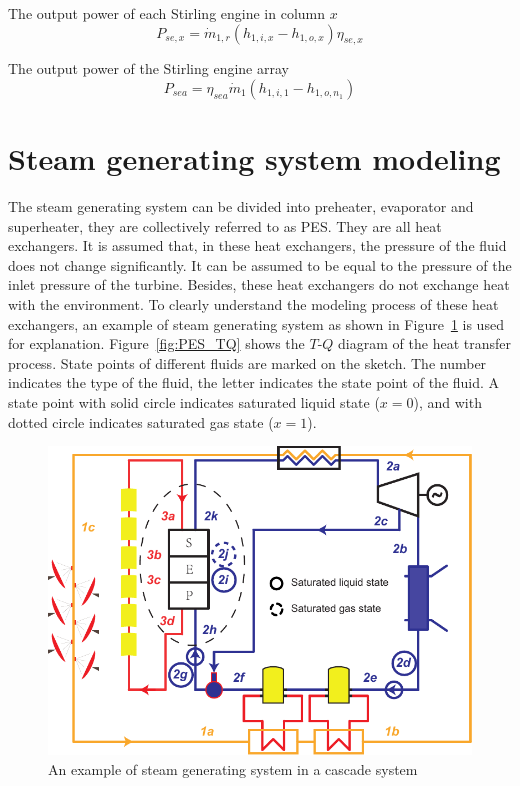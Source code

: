 The output power of each Stirling engine in column $x$
\begin{equation}
  P_{se,x}=\dot{m}_{1,r}(h_{1,i,x}-h_{1,o,x})\eta_{se,x}
\end{equation}

The output power of the Stirling engine array
\begin{equation}
  P_{sea}=\eta_{sea}\dot{m}_{1}(h_{1,i,1}-h_{1,o,n_1})
\end{equation}

\section{Steam generating system modeling}
The steam generating system can be divided into preheater, evaporator and superheater, they are collectively referred to as PES. They are all heat exchangers. It is assumed that, in these heat exchangers, the pressure of the fluid does not change significantly. It can be assumed to be equal to the pressure of the inlet pressure of the turbine. Besides, these heat exchangers do not exchange heat with the environment.
To clearly understand the modeling process of these heat exchangers, an example of steam generating system as shown in Figure~\ref{fig:PES} is used for explanation. Figure~\ref{fig:PES_TQ} shows the $T$-$Q$ diagram of the heat transfer process. State points of different fluids are marked on the sketch. The number indicates the type of the fluid, the letter indicates the state point of the fluid. A state point with solid circle indicates saturated liquid state ($x = 0$), and with dotted circle indicates saturated gas state ($x = 1$).


\noindent \begin{figure}[!ht]
\begin{center}
	\includegraphics[width = 0.8\columnwidth]{fig/PES}
	\caption{An example of steam generating system in a cascade system}
	\label{fig:PES}
\end{center}
\end{figure}


